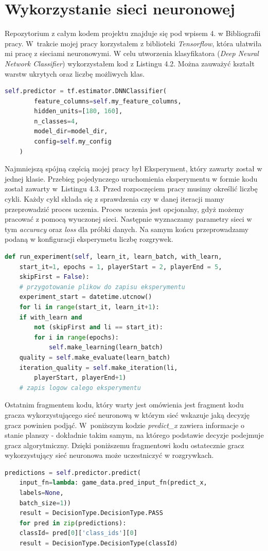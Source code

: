 \documentclass[12pt, oneside]{report}
\begin{document}
	\section{Wykorzystanie sieci neuronowej}
	Repozytorium z całym kodem projektu znajduje się pod wpisem 4. w Bibliografii pracy.
	W~trakcie mojej pracy korzystałem z biblioteki \textit{Tensorflow}, która ułatwiła mi pracę z sieciami 
	neuronowymi. W celu utworzenia klasyfikatora (\textit{Deep Neural Network Classifier}) wykorzystałem kod z Listingu 4.2. Można zauważyć kształt warstw ukrytych oraz liczbę możliwych klas.
	
	\begin{lstlisting}[frame=single, language=Python, caption=Konfiguracja klasyfikatora]
	self.predictor = tf.estimator.DNNClassifier(
		feature_columns=self.my_feature_columns,
		hidden_units=[180, 160],
		n_classes=4,
		model_dir=model_dir,
		config=self.my_config
	)
	\end{lstlisting}
	
	Najmniejszą spójną częścią mojej pracy był Eksperyment, który zawarty został w jednej klasie. Przebieg pojedynczego uruchomienia eksperymentu w formie kodu został zawarty w~Listingu 4.3. Przed rozpoczęciem pracy musimy określić liczbę cykli. Każdy cykl składa się z sprawdzenia czy w danej iteracji mamy przeprowadzić proces uczenia. Proces uczenia jest opcjonalny, gdyż możemy pracować z pomocą wyuczonej sieci. Następnie wyznaczamy parametry sieci w tym \textit{accuracy} oraz \textit{loss} dla próbki danych. Na samym końcu przeprowadzamy podaną w konfiguracji eksperymetu liczbę rozgrywek. 
	\begin{lstlisting}[frame=single, language=Python, caption=Funkcja przeprowadzająca pojedynczy eksperyment]
def run_experiment(self, learn_it, learn_batch, with_learn, 
	start_it=1, epochs = 1, playerStart = 2, playerEnd = 5, 
	skipFirst = False):
	# przygotowanie plikow do zapisu eksperymentu
	experiment_start = datetime.utcnow()
	for li in range(start_it, learn_it+1):
	if with_learn and 
		not (skipFirst and li == start_it):
		for i in range(epochs):
			self.make_learning(learn_batch)
	quality = self.make_evaluate(learn_batch)
	iteration_quality = self.make_iteration(li, 
		playerStart, playerEnd+1)
	# zapis logow calego eksperymentu
	\end{lstlisting}
	
	Ostatnim fragmentem kodu, który warty jest omówienia jest fragment kodu gracza wykorzystującego sieć neuronową w którym sieć wskazuje jaką decyzję gracz powinien podjąć. W~poniższym kodzie \textit{predict\_x} zawiera informacje o stanie planszy - dokładnie takim samym, na którego podstawie decyzje podejmuje gracz algorytmiczny. Dzięki poniższemu fragmentowi kodu ostatecznie gracz wykorzystujący sieć neuronowa może uczestniczyć w rozgrywkach. 
	\begin{lstlisting}[frame=single, language=Python, caption=Wyznaczenie klasy decyzji]
	predictions = self.predictor.predict(
	input_fn=lambda: game_data.pred_input_fn(predict_x,
	labels=None,
	batch_size=1))
	result = DecisionType.DecisionType.PASS
	for pred in zip(predictions):
	classId= pred[0]['class_ids'][0]
	result = DecisionType.DecisionType(classId)
	\end{lstlisting}
	
\end{document}
